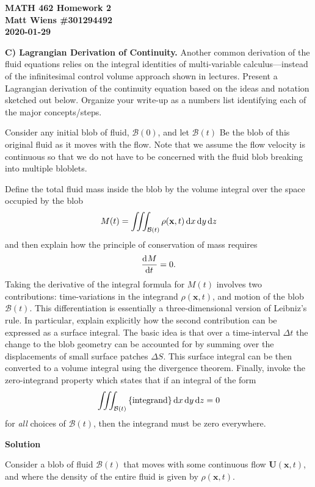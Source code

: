 \documentclass{article}
\def\*#1{\mathbf{#1}}
\newcommand{\B}{\mathcal{B}}
\begin{document}
\textbf{MATH 462 Homework 2} \\
\textbf{Matt Wiens \#301294492} \\
\textbf{2020-01-29}

\textbf{C) Lagrangian Derivation of Continuity.} Another common
derivation of the fluid equations relies on the integral identities of
multi-variable calculus---instead of the infinitesimal control volume
approach shown in lectures. Present a Lagrangian derivation of the
continuity equation based on the ideas and notation sketched out below.
Organize your write-up as a numbers list identifying each of the major
concepts/steps.

Consider any initial blob of fluid, $\B(0)$, and let $\B(t)$ Be the blob
of this original fluid as it moves with the flow. Note that we assume
the flow velocity is continuous so that we do not have to be concerned
with the fluid blob breaking into multiple bloblets.

Define the total fluid mass inside the blob by the volume integral over
the space occupied by the blob
%
\begin{equation*}
    M(t) = \iiint_{\B(t)} \rho(\*x, t) \dif x \dif y \dif z
\end{equation*}
%
and then explain how the principle of conservation of mass requires
%
\begin{equation*}
    \dod{M}{t} = 0
    .
\end{equation*}
%
Taking the derivative of the integral formula for $M(t)$ involves two
contributions: time-variations in the integrand $\rho(\*x, t)$, and
motion of the blob $\B(t)$. This differentiation is essentially a
three-dimensional version of Leibniz's rule. In particular, explain
explicitly how the second contribution can be expressed as a surface
integral. The basic idea is that over a time-interval $\Delta t$ the
change to the blob geometry can be accounted for by summing over the
displacements of small surface patches $\Delta S$. This surface integral
can be then converted to a volume integral using the divergence theorem.
Finally, invoke the zero-integrand property which states that if an
integral of the form
%
\begin{equation*}
    \iiint_{\B(t)} \cbr{\text{integrand}} \dif x \dif y \dif z = 0
\end{equation*}
%
for \textit{all} choices of $\B(t)$, then the integrand must be zero
everywhere.

\textbf{Solution}

Consider a blob of fluid $\B(t)$ that moves with some continuous flow
$\*U(\*x, t)$, and where the density of the entire fluid is given by
$\rho(\*x, t)$.
\end{document}
